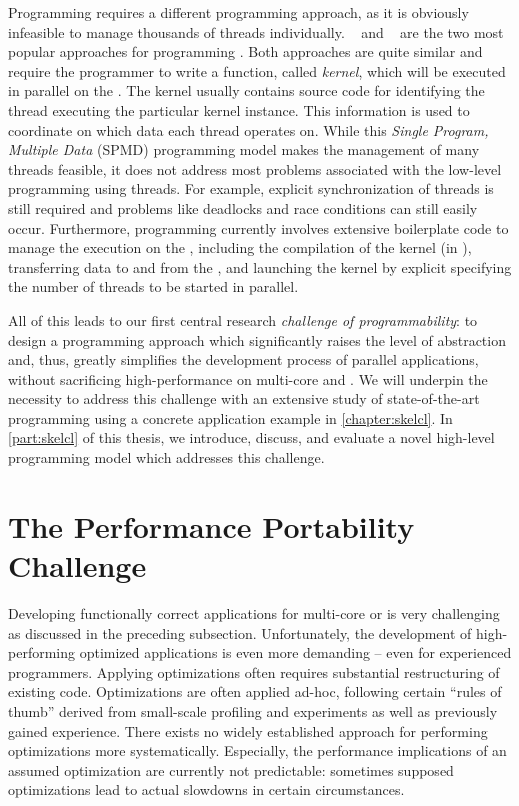 Programming \GPUs requires a different programming approach, as it is obviously infeasible to manage thousands of threads individually.
\CUDA~\cite{CUDAProgrammingGuide} and \OpenCL~\cite{OpenCL} are the two most popular approaches for programming \GPUs.
Both approaches are quite similar and require the programmer to write a function, called \emph{kernel}, which will be executed in parallel on the \GPU.
The kernel usually contains source code for identifying the thread executing the particular kernel instance.
This information is used to coordinate on which data each thread operates on.
While this \emph{Single Program, Multiple Data} (SPMD) programming model makes the management of many threads feasible, it does not address most problems associated with the low-level programming using threads.
For example, explicit synchronization of threads is still required and problems like deadlocks and race conditions can still easily occur.
Furthermore, \GPU programming currently involves extensive boilerplate code to manage the execution on the \GPU, including the compilation of the kernel (in \OpenCL), transferring data to and from the \GPU, and launching the kernel by explicit specifying the number of threads to be started in parallel.

All of this leads to our first central research \emph{challenge of programmability}:
to design a programming approach which significantly raises the level of abstraction and, thus, greatly simplifies the development process of parallel applications, without sacrificing high-performance on multi-core \CPUs and \GPUs.
We will underpin the necessity to address this challenge with an extensive study of state-of-the-art \GPU programming using a concrete application example in \autoref{chapter:skelcl}.
In \autoref{part:skelcl} of this thesis, we introduce, discuss, and evaluate a novel high-level programming model which addresses this challenge.

\pagebreak
\section{The Performance Portability Challenge}

Developing functionally correct applications for multi-core \CPUs or \GPUs is very challenging as discussed in the preceding subsection.
Unfortunately, the development of high-performing optimized applications is even more demanding -- even for experienced programmers.
Applying optimizations often requires substantial restructuring of existing code.
Optimizations are often applied ad-hoc, following certain ``rules of thumb'' derived from small-scale profiling and experiments as well as previously gained experience.
There exists no widely established approach for performing optimizations more systematically.
Especially, the performance implications of an assumed optimization are currently not predictable:
sometimes supposed optimizations lead to actual slowdowns in certain circumstances.

